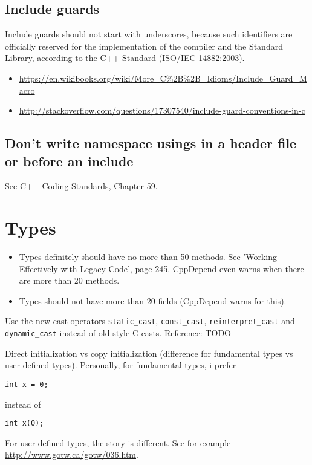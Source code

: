 \documentclass{article}
\begin{document}
\subsection{Include guards}

\begin{guideline}
Include guards should not start with underscores, because such identifiers are officially reserved for the implementation of the compiler and the Standard Library, according to the C++ Standard (ISO/IEC 14882:2003).
\end{guideline}
\begin{itemize}
\item \url{https://en.wikibooks.org/wiki/More_C%2B%2B_Idioms/Include_Guard_Macro}
\item \url{http://stackoverflow.com/questions/17307540/include-guard-conventions-in-c}
\end{itemize}

\subsection{Don't write namespace usings in a header file or before an include}
See C++ Coding Standards, Chapter 59.

\section{Types}

\begin{itemize}
\item Types definitely should have no more than 50 methods.
See 'Working Effectively with Legacy Code', page 245.
CppDepend even warns when there are more than 20 methods.
\item Types should not have more than 20 fields (CppDepend warns for this).
\end{itemize}

Use the new cast operators \lstinline{static_cast}, \lstinline{const_cast}, \lstinline{reinterpret_cast} and \lstinline{dynamic_cast} instead of old-style C-casts.
Reference: TODO

Direct initialization vs copy initialization (difference for fundamental types vs user-defined types).  Personally, for fundamental types, i prefer
\begin{lstlisting}
int x = 0;
\end{lstlisting}
instead of
\begin{lstlisting}
int x(0);
\end{lstlisting}
For user-defined types, the story is different.  See for example \url{http://www.gotw.ca/gotw/036.htm}.
\end{document}
